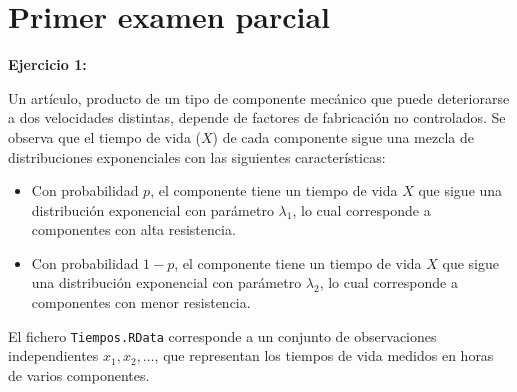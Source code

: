 \section{Primer examen parcial}

\textbf{Ejercicio 1:}

Un artículo, producto de un tipo de componente mecánico que puede deteriorarse a dos velocidades distintas, depende de factores de fabricación no controlados.  
Se observa que el tiempo de vida ($X$) de cada componente sigue una mezcla de distribuciones exponenciales con las siguientes características:

\begin{itemize}
    \item Con probabilidad \(p\), el componente tiene un tiempo de vida \(X\) que sigue una distribución exponencial con parámetro \(\lambda_1\), lo cual corresponde a componentes con alta resistencia.
    \item Con probabilidad \(1-p\), el componente tiene un tiempo de vida \(X\) que sigue una distribución exponencial con parámetro \(\lambda_2\), lo cual corresponde a componentes con menor resistencia.
\end{itemize}

El fichero \texttt{Tiempos.RData} corresponde a un conjunto de observaciones independientes \(x_1, x_2, \dots \), que representan los tiempos de vida medidos en horas de varios componentes.

